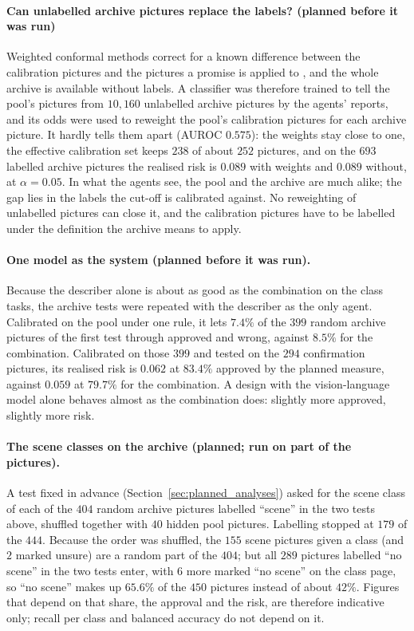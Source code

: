 \paragraph{Can unlabelled archive pictures replace the labels? (planned before it was run)} Weighted conformal methods correct for a known difference between the calibration pictures and the pictures a promise is applied to \cite{tibshirani2019covariate}, and the whole archive is available without labels. A classifier was therefore trained to tell the pool's pictures from $10{,}160$ unlabelled archive pictures by the agents' reports, and its odds were used to reweight the pool's calibration pictures for each archive picture. It hardly tells them apart (AUROC $0.575$): the weights stay close to one, the effective calibration set keeps $238$ of about $252$ pictures, and on the $693$ labelled archive pictures the realised risk is $0.089$ with weights and $0.089$ without, at $\alpha = 0.05$. In what the agents see, the pool and the archive are much alike; the gap lies in the labels the cut-off is calibrated against. No reweighting of unlabelled pictures can close it, and the calibration pictures have to be labelled under the definition the archive means to apply.

\paragraph{One model as the system (planned before it was run).} Because the describer alone is about as good as the combination on the class tasks, the archive tests were repeated with the describer as the only agent. Calibrated on the pool under one rule, it lets $7.4\%$ of the $399$ random archive pictures of the first test through approved and wrong, against $8.5\%$ for the combination. Calibrated on those $399$ and tested on the $294$ confirmation pictures, its realised risk is $0.062$ at $83.4\%$ approved by the planned measure, against $0.059$ at $79.7\%$ for the combination. A design with the vision-language model alone behaves almost as the combination does: slightly more approved, slightly more risk.

\paragraph{The scene classes on the archive (planned; run on part of the pictures).} A test fixed in advance (Section~\ref{sec:planned_analyses}) asked for the scene class of each of the $404$ random archive pictures labelled ``scene'' in the two tests above, shuffled together with $40$ hidden pool pictures. Labelling stopped at $179$ of the $444$. Because the order was shuffled, the $155$ scene pictures given a class (and $2$ marked unsure) are a random part of the $404$; but all $289$ pictures labelled ``no scene'' in the two tests enter, with $6$ more marked ``no scene'' on the class page, so ``no scene'' makes up $65.6\%$ of the $450$ pictures instead of about $42\%$. Figures that depend on that share, the approval and the risk, are therefore indicative only; recall per class and balanced accuracy do not depend on it.

